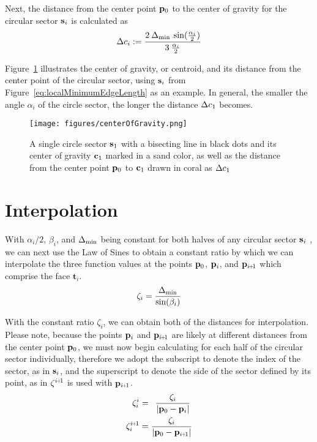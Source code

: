 Next, the distance from the center point $\mathbf{p}_0$ to the center of gravity for the circular sector $\mathbf{s}_i$ is calculated as
\begin{equation}
	\Delta c_i := \frac{2\:\Delta_\text{min}\:\sin(\frac{\alpha_i}{2})}{3\:\frac{\alpha_i}{2}}
	\label{eq:distToCoG}
\end{equation}
%
%

Figure~\ref{fig:centerOfGravity} illustrates the center of gravity, or centroid,  and its distance from the center point of the circular sector, using $\mathbf{s}_i$ from Figure~\ref{eq:localMinimumEdgeLength} as an example. In general, the smaller the angle $\alpha_i$ of the circle sector, the longer the distance $\Delta c_1$ becomes.
\begin{figure}[ht]
\ffigbox
	{\texttt{[image: figures/centerOfGravity.png]}}
	{\caption[Distance to and Center of Gravity]{A single circle sector $\mathbf{s}_1$ with a bisecting line in black dots and its center of gravity $\mathbf{c}_1$ marked in a sand color, as well as the distance from the center point $\mathbf{p}_0$ to $\mathbf{c}_1$ drawn in coral as $\Delta c_1$}\label{fig:centerOfGravity}}
\end{figure}%
%
%
\section{Interpolation}
With $\alpha_i/2$, $\beta_i$, and $\Delta_\text{min}$ being constant for both halves of any circular sector $\mathbf{s}_i$ , we can next use the Law of Sines to obtain a constant ratio by which we can interpolate the three function values at the points $\mathbf{p}_0$, $\mathbf{p}_i$, and $\bp_{\sipo}$ which comprise the face $\mathbf{t}_i$.
\begin{equation}
	\zeta_i = \frac{\Delta_\text{min}}{\sin(\beta_i)}
	\label{eq:zeta}
\end{equation}

With the constant ratio $\zeta_i$, we can obtain both of the distances for interpolation. Please note, because the points $\mathbf{p}_i$ and $\bp_{\sipo}$ are likely at different distances from the center point $\mathbf{p}_0$, we must now begin calculating for each half of the circular sector individually, therefore we  adopt the subscript to denote the index of the sector, as in $\mathbf{s}_i$, and the superscript to denote the side of the sector defined by its point, as in $\zeta^{\sipo}$ is used with $\bp_{\sipo}$.
\begin{align}
	\zeta^i_i & = \enspace\frac{\zeta_i}{|\bp_0 - \bp_i|}
	\label{eq:distanceIForInterpolation}\\
	\zeta^{\sipo}_i & = \frac{\zeta_i}{|\bp_0 - \bp_{\sipo}|}
	\label{eq:distanceIp1ForInterpolation}
\end{align}

